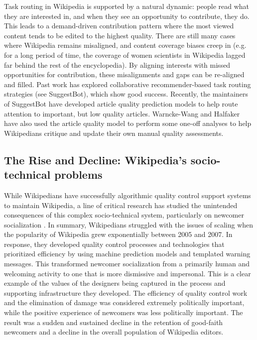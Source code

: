  Task routing in Wikipedia is supported by a natural dynamic: people read what they are interested in, and when they see an opportunity to contribute, they do.  This leads to a demand-driven contribution pattern where the most viewed content tends to be edited to the highest quality\cite{hill2014consider}.  There are still many cases where Wikipedia remains misaligned\cite{wang2015misalignment}, and content coverage biases creep in (e.g. for a long period of time, the coverage of women scientists in Wikipedia lagged far behind the rest of the encyclopedia\cite{halfaker2017interpolating}).  By aligning interests with missed opportunities for contribution, these misalignments and gaps can be re-aligned and filled.  Past work has explored collaborative recommender-based task routing strategies (see SuggestBot\cite{cosley2007suggestbot}), which show good success.  Recently, the maintainers of SuggestBot have developed article quality prediction models to help route attention to important, but low quality articles\cite{wang2013tell}.  Warncke-Wang and Halfaker have also used the article quality model to perform some one-off analyses to help Wikipedians critique and update their own manual quality assessments\cite{wang2014screening}.

\subsection{The Rise and Decline: Wikipedia's socio-technical problems}
While Wikipedians have successfully algorithmic quality control support systems to maintain Wikipedia, a line of critical research has studied the unintended consequences of this complex socio-technical system, particularly on newcomer socialization \cite{halfaker2013rise,morgan2013tea,halfaker2014snuggle}.  In summary, Wikipedians struggled with the issues of scaling when the popularity of Wikipedia grew exponentially between 2005 and 2007\cite{halfaker2013rise}.  In response, they developed quality control processes and technologies that prioritized efficiency by using machine prediction models\cite{halfaker2014snuggle} and templated warning messages\cite{halfaker2013rise}.  This transformed newcomer socialization from a primarily human and welcoming activity to one that is more dismissive and impersonal\cite{morgan2013tea}.  This is a clear example of the values of the designers being captured in the process and supporting infrastructure they developed\cite{halfaker2014snuggle}.  The efficiency of quality control work and the elimination of damage was considered extremely politically important, while the positive experience of newcomers was less politically important.  The result was a sudden and sustained decline in the retention of good-faith newcomers and a decline in the overall population of Wikipedia editors\cite{halfaker2013rise}.

